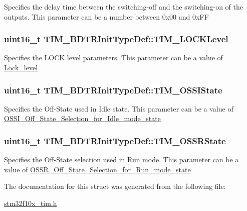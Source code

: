 \label{structTIM__BDTRInitTypeDef_a01ccbaffccdb3068b8a60c912579b1a2}
Specifies the delay time between the switching-\/off and the switching-\/on of the outputs. This parameter can be a number between 0x00 and 0xFF \hypertarget{structTIM__BDTRInitTypeDef_aa5296a7b194d25b16899f6a98da01f03}{
\subsubsection[{TIM\_\-LOCKLevel}]{\setlength{\rightskip}{0pt plus 5cm}uint16\_\-t {\bf TIM\_\-BDTRInitTypeDef::TIM\_\-LOCKLevel}}}
\label{structTIM__BDTRInitTypeDef_aa5296a7b194d25b16899f6a98da01f03}
Specifies the LOCK level parameters. This parameter can be a value of \hyperlink{group__Lock__level}{Lock\_\-level} \hypertarget{structTIM__BDTRInitTypeDef_ad8891e3739a7db8a45343d4e2f9d2824}{
\subsubsection[{TIM\_\-OSSIState}]{\setlength{\rightskip}{0pt plus 5cm}uint16\_\-t {\bf TIM\_\-BDTRInitTypeDef::TIM\_\-OSSIState}}}
\label{structTIM__BDTRInitTypeDef_ad8891e3739a7db8a45343d4e2f9d2824}
Specifies the Off-\/State used in Idle state. This parameter can be a value of \hyperlink{group__OSSI__Off__State__Selection__for__Idle__mode__state}{OSSI\_\-Off\_\-State\_\-Selection\_\-for\_\-Idle\_\-mode\_\-state} \hypertarget{structTIM__BDTRInitTypeDef_a8f34ad7bc4764bd3ff372cadde468072}{
\subsubsection[{TIM\_\-OSSRState}]{\setlength{\rightskip}{0pt plus 5cm}uint16\_\-t {\bf TIM\_\-BDTRInitTypeDef::TIM\_\-OSSRState}}}
\label{structTIM__BDTRInitTypeDef_a8f34ad7bc4764bd3ff372cadde468072}
Specifies the Off-\/State selection used in Run mode. This parameter can be a value of \hyperlink{group__OSSR__Off__State__Selection__for__Run__mode__state}{OSSR\_\-Off\_\-State\_\-Selection\_\-for\_\-Run\_\-mode\_\-state} 

The documentation for this struct was generated from the following file:\begin{DoxyCompactItemize}
\item 
\hyperlink{stm32f10x__tim_8h}{stm32f10x\_\-tim.h}\end{DoxyCompactItemize}
